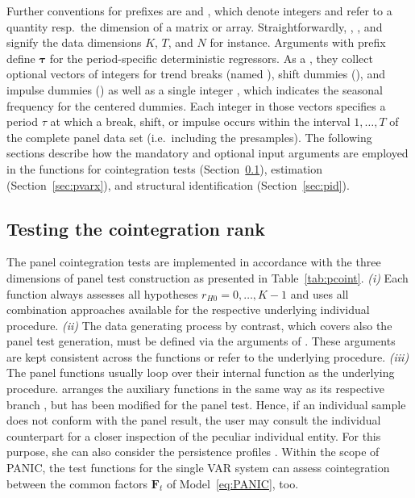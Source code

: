Further conventions for prefixes are  and , which denote integers and refer to a quantity resp.~the dimension of a matrix or array. Straightforwardly, , , and  signify the data dimensions $ K $, $ T $, and $ N $ for instance. Arguments with prefix \mbox{} define $ \boldsymbol{\tau} $ for the period-specific deterministic regressors. As a , they collect optional vectors of integers for trend breaks (named ), shift dummies (), and impulse dummies () as well as a single integer , which indicates the seasonal frequency for the centered dummies. Each integer in those vectors specifies a period $ \tau $ at which a break, shift, or impulse occurs within the interval $ 1,\ldots,T $ of the complete panel data set (i.e.~including the presamples). The following sections describe how the mandatory and optional input arguments are employed in the  functions for cointegration tests (Section~\ref{sec:pcoint}), estimation (Section~\ref{sec:pvarx}), and structural identification (Section~\ref{sec:pid}).


\subsection{Testing the cointegration rank} \label{sec:pcoint}
The panel cointegration tests are implemented in accordance with the three dimensions of panel test construction as presented in Table~\ref{tab:pcoint}. \textit{(i)} Each  function always assesses all hypotheses $ r_{H0} = 0,\ldots,K-1 $ and uses all combination approaches available for the respective underlying individual procedure. \textit{(ii)} The data generating process by contrast, which covers also the panel test generation, must be defined via the arguments of \mbox{}. These arguments are kept consistent across the functions or refer to the underlying procedure. \textit{(iii)} The panel functions  usually loop over their internal function  as the underlying procedure.  arranges the auxiliary functions in the same way as its respective branch \mbox{}, but has been modified for the panel test. Hence, if an individual sample does not conform with the panel result, the user may consult the individual counterpart  for a closer inspection of the peculiar individual entity. For this purpose, she can also consider the persistence profiles . Within the scope of PANIC, the test functions  for the single VAR system can assess cointegration between the common factors $ \boldsymbol{F}_t $ of Model~\eqref{eq:PANIC}, too.

